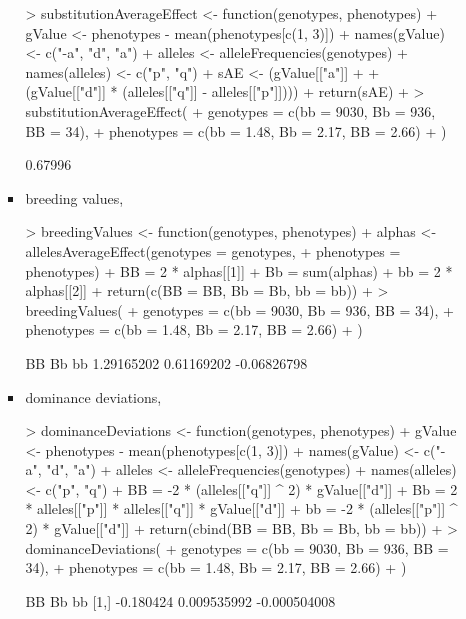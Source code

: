 \documentclass[12pt,a4paper]{paper}
\begin{document}
\begin{enumerate}
\begin{enumerate}
\begin{itemize}
\begin{Schunk}
\begin{Sinput}
> substitutionAverageEffect <- function(genotypes, phenotypes) {
+   gValue <- phenotypes - mean(phenotypes[c(1, 3)])
+   names(gValue) <- c("-a", "d", "a")
+   alleles <- alleleFrequencies(genotypes)
+   names(alleles) <- c("p", "q")
+   sAE <- (gValue[["a"]] +
+             (gValue[["d"]] * (alleles[["q"]] - alleles[["p"]])))
+   return(sAE)
+ }
> substitutionAverageEffect(
+ genotypes = c(bb = 9030, Bb = 936, BB = 34),
+ phenotypes = c(bb = 1.48, Bb = 2.17, BB = 2.66)
+ )
\end{Sinput}
\begin{Soutput}
[1] 0.67996
\end{Soutput}
\end{Schunk}
\item breeding values,
\begin{Schunk}
\begin{Sinput}
> breedingValues <- function(genotypes, phenotypes) {
+   alphas <- allelesAverageEffect(genotypes = genotypes,
+                                  phenotypes = phenotypes)
+   BB = 2 * alphas[[1]]
+   Bb = sum(alphas)
+   bb = 2 * alphas[[2]]
+   return(c(BB = BB, Bb = Bb, bb = bb))
+ }
> breedingValues(
+ genotypes = c(bb = 9030, Bb = 936, BB = 34),
+ phenotypes = c(bb = 1.48, Bb = 2.17, BB = 2.66)
+ )
\end{Sinput}
\begin{Soutput}
         BB          Bb          bb 
 1.29165202  0.61169202 -0.06826798 
\end{Soutput}
\end{Schunk}
\item dominance deviations, 
\begin{Schunk}
\begin{Sinput}
> dominanceDeviations <- function(genotypes, phenotypes){
+   gValue <- phenotypes - mean(phenotypes[c(1, 3)])
+   names(gValue) <- c("-a", "d", "a")
+   alleles <- alleleFrequencies(genotypes)
+   names(alleles) <- c("p", "q")
+   BB = -2 * (alleles[["q"]] ^ 2) * gValue[["d"]]
+   Bb = 2 * alleles[["p"]] * alleles[["q"]] * gValue[["d"]]
+   bb = -2 * (alleles[["p"]] ^ 2) * gValue[["d"]]
+   return(cbind(BB = BB, Bb = Bb, bb = bb))
+ }
> dominanceDeviations(
+ genotypes = c(bb = 9030, Bb = 936, BB = 34),
+ phenotypes = c(bb = 1.48, Bb = 2.17, BB = 2.66)
+ )
\end{Sinput}
\begin{Soutput}
            BB          Bb           bb
[1,] -0.180424 0.009535992 -0.000504008
\end{Soutput}

\end{Schunk}
\end{itemize}
\end{enumerate}
\end{enumerate}
\end{document}
